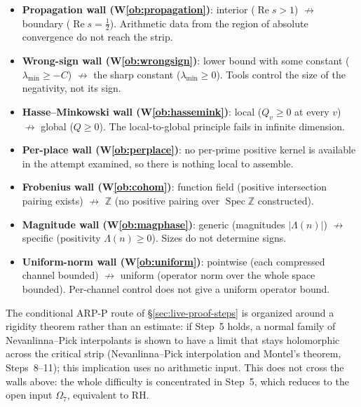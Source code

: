 \documentclass[11pt]{amsart}
\theoremstyle{definition}
\theoremstyle{remark}
\theoremstyle{definition}
\renewcommand{\Re}{\operatorname{Re}}
\newcommand{\Spec}{\operatorname{Spec}}
\begin{document}
\begin{itemize}[leftmargin=1.6em]
\item \textbf{Propagation wall (W\ref{ob:propagation})}: interior ($\Re s>1$) $\not\to$ boundary
($\Re s=\tfrac12$). Arithmetic data from the region of absolute convergence do not reach the strip.
\item \textbf{Wrong-sign wall (W\ref{ob:wrongsign})}: lower bound with some constant
($\lambda_{\min}\ge-C$) $\not\to$ the sharp constant ($\lambda_{\min}\ge0$). Tools control the size of the
negativity, not its sign.
\item \textbf{Hasse--Minkowski wall (W\ref{ob:hassemink})}: local ($Q_v\ge0$ at every $v$) $\not\to$
global ($Q\ge0$). The local-to-global principle fails in infinite dimension.
\item \textbf{Per-place wall (W\ref{ob:perplace})}: no per-prime positive kernel is available in the
attempt examined, so there is nothing local to assemble.
\item \textbf{Frobenius wall (W\ref{ob:cohom})}: function field (positive intersection pairing exists)
$\not\to$ $\mathbb Z$ (no positive pairing over $\Spec\mathbb Z$ constructed).
\item \textbf{Magnitude wall (W\ref{ob:magphase})}: generic (magnitudes $|\Lambda(n)|$) $\not\to$
specific (positivity $\Lambda(n)\ge0$). Sizes do not determine signs.
\item \textbf{Uniform-norm wall (W\ref{ob:uniform})}: pointwise (each compressed channel bounded)
$\not\to$ uniform (operator norm over the whole space bounded). Per-channel control does not give a
uniform operator bound.
\end{itemize}

\noindent The conditional ARP-P route of \S\ref{sec:live-proof-steps} is organized around a rigidity
theorem rather than an estimate: if Step~5 holds, a normal family of Nevanlinna--Pick interpolants is shown to
have a limit that stays holomorphic across the critical strip (Nevanlinna--Pick interpolation and
Montel's theorem, Steps~8--11); this implication uses no arithmetic input. This does not cross the walls above: the whole difficulty is concentrated in Step~5,
which reduces to the open input $\Omega_7$, equivalent to RH.
\end{document}
